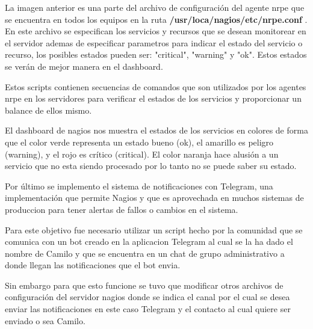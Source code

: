    
   
   La imagen anterior es una parte del archivo de configuración del agente nrpe que se encuentra en todos los equipos en la ruta \textbf{/usr/loca/nagios/etc/nrpe.conf} . En este archivo se especifican los servicios y recursos que se desean monitorear en el servidor ademas de especificar parametros para indicar el estado del servicio o recurso, los posibles estados pueden ser: "critical", "warning" y "ok". Estos estados se verán de mejor manera en el dashboard.
   
   
   Estos scripts contienen secuencias de comandos que son utilizados por los agentes nrpe en los servidores para verificar el estados de los servicios y proporcionar un balance de ellos mismo.
   
   
   
    
    
    El dashboard de nagios nos muestra el estados de los servicios en colores de forma que el color verde representa  un estado bueno (ok), el amarillo es peligro (warning), y el rojo es crítico (critical). El color naranja hace alusión a un servicio que no esta siendo procesado por lo tanto no se puede saber su estado.
    
    
    Por último se implemento el sistema de notificaciones con Telegram, una implementación que permite Nagios y que es aprovechada en muchos sistemas de produccion para tener alertas de fallos o cambios en el sistema.
    
    Para este objetivo fue necesario utilizar un script hecho por la comunidad  que se comunica con un bot creado en la aplicacion Telegram al cual se la ha dado el nombre de Camilo y que se encuentra en un chat de grupo administrativo a donde llegan las notificaciones que el bot envia.
    
    
     
     Sin embargo para que esto funcione se tuvo que modificar otros archivos de configuración del servidor nagios donde se indica el canal por el cual se desea enviar las notificaciones en este caso Telegram y el contacto al cual quiere ser enviado o sea Camilo.
     
     
     
